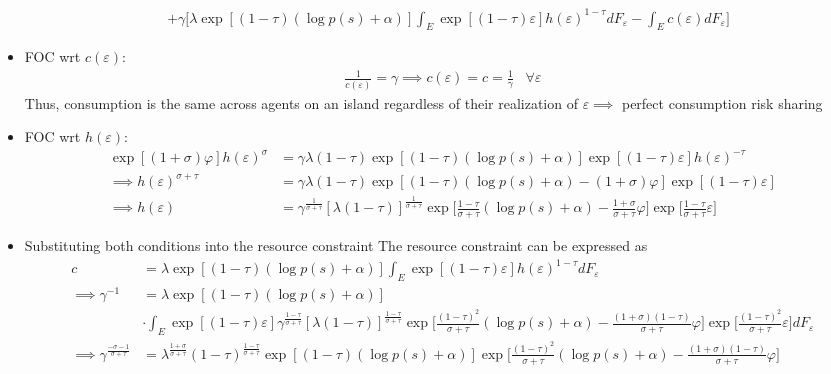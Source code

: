 \documentclass{article}
\begin{document}
\begin{itemize}
\begin{align*}
&+ \gamma \Bigg[\lambda \exp [(1-\tau)(\log p(s)+ \alpha)] \int_E \exp [(1-\tau) \varepsilon] h(\varepsilon)^{1-\tau} dF_\varepsilon - \int_E c(\varepsilon) dF_\varepsilon \Bigg]
\end{align*}
\item FOC wrt $c(\varepsilon)$:
\begin{align*}
\frac{1}{c(\varepsilon)} = \gamma \implies c(\varepsilon) = c = \frac{1}{\gamma} \;\;\; \forall \varepsilon
\end{align*}
Thus, consumption is the same across agents on an island regardless of their realization of $\varepsilon \implies$ perfect consumption risk sharing
\item FOC wrt $h(\varepsilon)$:
\begin{align*}
\exp[(1+\sigma) \varphi] h(\varepsilon)^{\sigma} &= \gamma \lambda (1-\tau) \exp [(1-\tau)(\log p(s)+ \alpha)]  \exp [(1-\tau) \varepsilon] h(\varepsilon)^{-\tau} \\
\implies
h(\varepsilon)^{\sigma+\tau} &= \gamma \lambda (1-\tau) \exp [(1-\tau)(\log p(s)+ \alpha)-(1+\sigma) \varphi]  \exp [(1-\tau) \varepsilon] \\
\implies
h(\varepsilon) &= \gamma^{\frac{1}{\sigma+\tau}} [\lambda (1-\tau)]^{\frac{1}{\sigma+\tau}} \exp \Bigg[\frac{1-\tau}{\sigma +\tau}(\log p(s)+ \alpha)-\frac{1+\sigma}{\sigma+\tau} \varphi \Bigg]  \exp  \Bigg[\frac{1-\tau}{\sigma+\tau} \varepsilon  \Bigg]
\end{align*}
\item Substituting both conditions into the resource constraint
The resource constraint can be expressed as
\begin{align*}
c
&= \lambda \exp [(1-\tau)(\log p(s)+ \alpha)] \int_E \exp [(1-\tau) \varepsilon] h(\varepsilon)^{1-\tau} dF_\varepsilon \\
\implies
\gamma^{-1}
&= \lambda \exp [(1-\tau)(\log p(s)+ \alpha)] \\
&\cdot \int_E \exp [(1-\tau) \varepsilon]  \gamma^{\frac{1 - \tau}{\sigma+\tau}} [\lambda (1-\tau)]^{\frac{1 - \tau}{\sigma+\tau}} \exp \Bigg[\frac{(1-\tau)^2}{\sigma +\tau}(\log p(s)+ \alpha)-\frac{(1+\sigma)(1-\tau)}{\sigma+\tau} \varphi \Bigg]  \exp  \Bigg[\frac{(1-\tau)^2}{\sigma+\tau} \varepsilon  \Bigg] dF_\varepsilon\\
\implies
\gamma^{\frac{-\sigma -1 }{\sigma+\tau}}
&= \lambda^{\frac{1+\sigma}{\sigma +\tau}}  (1-\tau)^{\frac{1 - \tau}{\sigma+\tau}} \exp [(1-\tau)( \log p(s)+ \alpha)]   \exp \Bigg[\frac{(1-\tau)^2}{\sigma +\tau}(\log p(s)+ \alpha)-\frac{(1+\sigma)(1-\tau)}{\sigma+\tau} \varphi \Bigg]\\

\end{align*}
\end{itemize}
\end{document}
